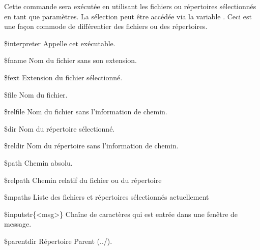 Cette commande sera exécutée en utilisant les fichiers ou répertoires sélectionnés en tant que paramètres. La sélection peut être accédée via la variable . Ceci est une façon commode de différentier des fichiers ou des répertoires.


%
\begin{codeentry}
\item[\$interpreter] Appelle cet exécutable.
\item[\$fname] Nom du fichier sans son extension.
\item[\$fext] Extension du fichier sélectionné.
\item[\$file] Nom du fichier.
\item[\$relfile] Nom du fichier sans l'information de chemin.
\item[\$dir] Nom du répertoire sélectionné.
\item[\$reldir] Nom du répertoire sans l'information de chemin.
\item[\$path] Chemin absolu.
\item[\$relpath] Chemin relatif du fichier ou du répertoire
\item[\$mpaths] Liste des fichiers et répertoires sélectionnés actuellement
\item[\$inputstr\{<msg>\}] Chaîne de caractères qui est entrée dans une fenêtre de message.
\item[\$parentdir] Répertoire Parent (../).
\end{codeentry}

%
%
%
%
%

